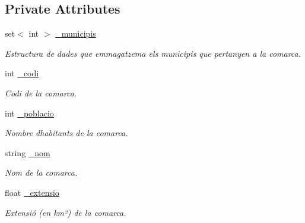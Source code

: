 \subsection*{Private Attributes}
\begin{DoxyCompactItemize}
\item 
\mbox{\label{classComarca_a8d445f43210359e5c6a86e1f6bbeb3f5}} 
set$<$ int $>$ \hyperlink{classComarca_a8d445f43210359e5c6a86e1f6bbeb3f5}{\+\_\+municipis}
\begin{DoxyCompactList}\small\item\em Estructura de dades que emmagatzema els municipis que pertanyen a la comarca. \end{DoxyCompactList}\item 
\mbox{\label{classComarca_ac8e4ac6d11804c90823ab02611bb6786}} 
int \hyperlink{classComarca_ac8e4ac6d11804c90823ab02611bb6786}{\+\_\+codi}
\begin{DoxyCompactList}\small\item\em Codi de la comarca. \end{DoxyCompactList}\item 
\mbox{\label{classComarca_a23d7f955141f175b887d9010ffd583e8}} 
int \hyperlink{classComarca_a23d7f955141f175b887d9010ffd583e8}{\+\_\+poblacio}
\begin{DoxyCompactList}\small\item\em Nombre d\textquotesingle{}habitants de la comarca. \end{DoxyCompactList}\item 
\mbox{\label{classComarca_a7af15f652d23d65d240943b06c351f0d}} 
string \hyperlink{classComarca_a7af15f652d23d65d240943b06c351f0d}{\+\_\+nom}
\begin{DoxyCompactList}\small\item\em Nom de la comarca. \end{DoxyCompactList}\item 
\mbox{\label{classComarca_adaf90baa4038057902deb537af5f1fe7}} 
float \hyperlink{classComarca_adaf90baa4038057902deb537af5f1fe7}{\+\_\+extensio}
\begin{DoxyCompactList}\small\item\em Extensió (en km²) de la comarca. \end{DoxyCompactList}\end{DoxyCompactItemize}
